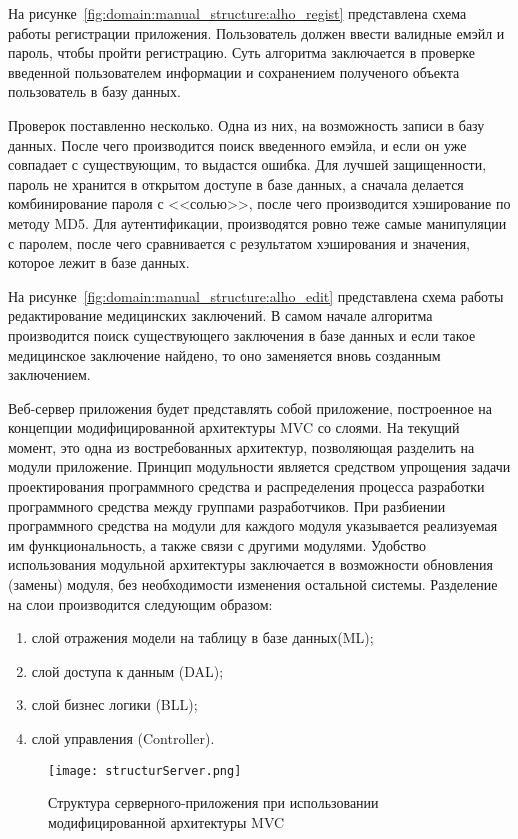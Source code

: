 На рисунке~\ref{fig:domain:manual_structure:alho_regist} представлена схема работы регистрации приложения. Пользователь должен ввести валидные емэйл и пароль, чтобы пройти регистрацию. Суть алгоритма заключается в проверке введенной пользователем информации и сохранением полученого объекта пользователь в базу данных. 

Проверок поставленно несколько. Одна из них, на возможность записи в базу данных. После чего производится поиск введенного емэйла, и если он уже совпадает с существующим, то выдастся ошибка. Для лучшей защищенности, пароль не хранится в открытом доступе в базе данных, а сначала делается комбинирование пароля с <<солью>>, после чего производится хэширование по методу MD5. Для аутентификации, производятся ровно теже самые манипуляции с паролем, после чего сравнивается с результатом хэширования и значения, которое лежит в базе данных. 

На рисунке~\ref{fig:domain:manual_structure:alho_edit} представлена схема работы редактирование медицинских заключений. В самом начале алгоритма производится поиск существующего заключения в базе данных и если такое медицинское заключение найдено, то оно заменяется вновь созданным заключением.

Веб-сервер приложения будет представлять собой приложение, построенное на концепции модифицированной архитектуры MVC со слоями. На текущий момент, это одна из востребованных архитектур, позволяющая разделить на модули приложение. Принцип модульности является средством упрощения задачи проектирования программного средства и распределения процесса разработки программного средства между группами разработчиков. При разбиении программного средства на модули для каждого модуля указывается реализуемая им функциональность, а также связи с другими модулями. Удобство использования модульной архитектуры заключается в возможности обновления (замены) модуля, без необходимости изменения остальной системы. Разделение на слои производится следующим образом:
\begin{enumerate}
  \item слой отражения модели на таблицу в базе данных(ML);
  \item слой доступа к данным (DAL);
  \item слой бизнес логики (BLL);
  \item слой управления (Controller).
\end{enumerate}

\begin{figure}[ht]
\centering
  \texttt{[image: structurServer.png]}  
  \caption{Структура серверного-приложения при использовании модифицированной архитектуры MVC}
  \label{fig:domain:manual_structure:structural_server}
\end{figure}

